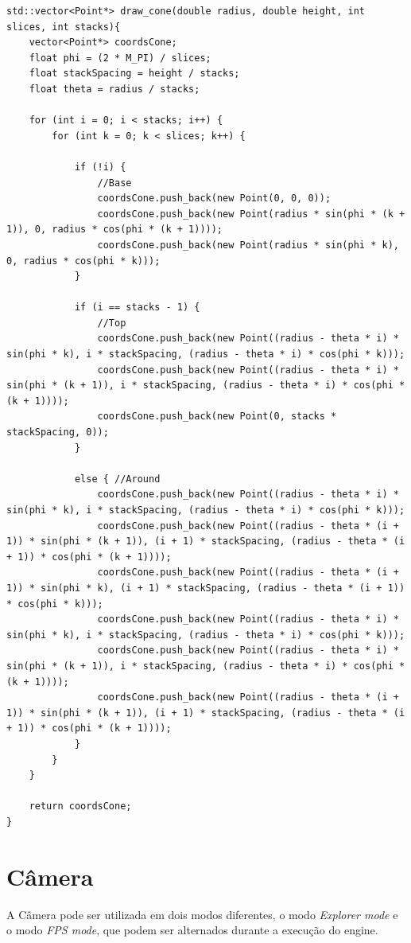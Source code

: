 \documentclass[a4paper]{article}
\begin{document}
\begin{lstlisting}
std::vector<Point*> draw_cone(double radius, double height, int slices, int stacks){
    vector<Point*> coordsCone;
    float phi = (2 * M_PI) / slices;
    float stackSpacing = height / stacks;
    float theta = radius / stacks;

    for (int i = 0; i < stacks; i++) {
        for (int k = 0; k < slices; k++) {

            if (!i) {
                //Base
                coordsCone.push_back(new Point(0, 0, 0));
                coordsCone.push_back(new Point(radius * sin(phi * (k + 1)), 0, radius * cos(phi * (k + 1))));
                coordsCone.push_back(new Point(radius * sin(phi * k), 0, radius * cos(phi * k)));
            }

            if (i == stacks - 1) {
                //Top
                coordsCone.push_back(new Point((radius - theta * i) * sin(phi * k), i * stackSpacing, (radius - theta * i) * cos(phi * k)));
                coordsCone.push_back(new Point((radius - theta * i) * sin(phi * (k + 1)), i * stackSpacing, (radius - theta * i) * cos(phi * (k + 1))));
                coordsCone.push_back(new Point(0, stacks * stackSpacing, 0));
            }

            else { //Around
                coordsCone.push_back(new Point((radius - theta * i) * sin(phi * k), i * stackSpacing, (radius - theta * i) * cos(phi * k)));
                coordsCone.push_back(new Point((radius - theta * (i + 1)) * sin(phi * (k + 1)), (i + 1) * stackSpacing, (radius - theta * (i + 1)) * cos(phi * (k + 1))));
                coordsCone.push_back(new Point((radius - theta * (i + 1)) * sin(phi * k), (i + 1) * stackSpacing, (radius - theta * (i + 1)) * cos(phi * k)));
                coordsCone.push_back(new Point((radius - theta * i) * sin(phi * k), i * stackSpacing, (radius - theta * i) * cos(phi * k)));
                coordsCone.push_back(new Point((radius - theta * i) * sin(phi * (k + 1)), i * stackSpacing, (radius - theta * i) * cos(phi * (k + 1))));
                coordsCone.push_back(new Point((radius - theta * (i + 1)) * sin(phi * (k + 1)), (i + 1) * stackSpacing, (radius - theta * (i + 1)) * cos(phi * (k + 1))));
            }
        }
    }

    return coordsCone;
}

\end{lstlisting}

\section{Câmera}
A Câmera pode ser utilizada em dois modos diferentes, o modo \textit{Explorer mode} e o modo \textit{FPS mode}, que podem ser alternados durante a execução do engine.
\end{document}
